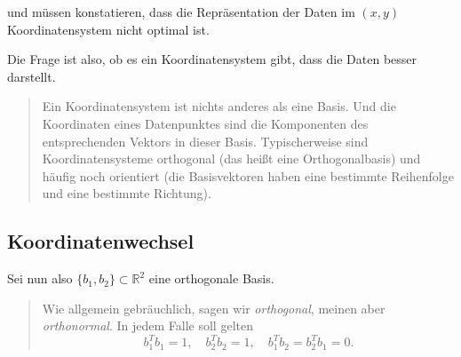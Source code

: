 \documentclass[
]{book}
\newenvironment {JHSAYS} [0] {\begin{quote}\color{jhsc}} {\end{quote}}
\theoremstyle{definition}
\theoremstyle{definition}
\theoremstyle{definition}
\theoremstyle{definition}
\theoremstyle{remark}
\begin{document}
und müssen konstatieren, dass die Repräsentation der Daten im \((x,y)\) Koordinatensystem nicht optimal ist.

Die Frage ist also, ob es ein Koordinatensystem gibt, dass die Daten besser darstellt.

\leavevmode{}%
\begin{JHSAYS}
Ein Koordinatensystem ist nichts anderes als eine Basis. Und die Koordinaten eines Datenpunktes sind die Komponenten des entsprechenden Vektors in dieser Basis. Typischerweise sind Koordinatensysteme orthogonal (das heißt eine Orthogonalbasis) und häufig noch orientiert (die Basisvektoren haben eine bestimmte Reihenfolge und eine bestimmte Richtung).

\end{JHSAYS}

\hypertarget{koordinatenwechsel}{%
\subsection{Koordinatenwechsel}\label{koordinatenwechsel}}

Sei nun also \(\{b_1,b_2\}\subset \mathbb R^{2}\) eine orthogonale Basis.

\leavevmode{}%
\begin{JHSAYS}
Wie allgemein gebräuchlich, sagen wir \emph{orthogonal}, meinen aber \emph{orthonormal}. In jedem Falle soll gelten
\begin{equation*}
b_1^T b_1=1, \quad b_2^Tb_2=1, \quad b_1^Tb_2 = b_2^Tb_1 = 0.
\end{equation*}

\end{JHSAYS}
\end{document}
